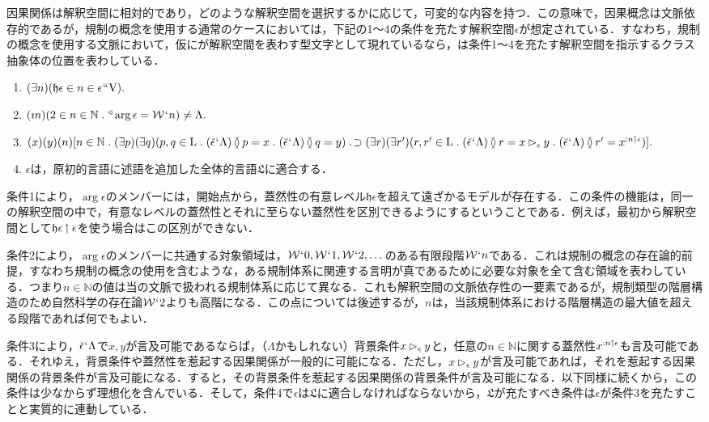 因果関係は解釈空間に相対的であり，どのような解釈空間を選択するかに応じて，可変的な内容を持つ．この意味で，因果概念は文脈依存的であるが，規制の概念を使用する通常のケースにおいては，下記の1〜4の条件を充たす解釈空間$ \epsilon $が想定されている．すなわち，規制の概念を使用する文脈において，仮に\kagi{$ \beta $}が解釈空間を表わす型文字として現れているなら，\kagi{$ \beta $}は条件1〜4を充たす解釈空間を指示するクラス抽象体の位置を表わしている．
\begin{enumerate}
    \item $ (\exists n)(\mathfrak{h}\epsilon\in n \in\epsilon{\mspace{1mu}{``}\mspace{1mu}}\mathrm{V}). $
    \item $ (\imath n)(2\in n\in\mathbb{N}\con{1}\trgl{\arg{\epsilon}}=\mathcal{W}\fap n)\neq\Lambda. $
    \item $ (x)(y)(n)[n\in\mathbb{N}\con{1}(\exists p)(\exists q)(p,q\in\mathrm{L}\con{1}
        (\breve{\epsilon}\fap\Lambda)\exten p = x\con{1}(\breve{\epsilon}\fap\Lambda)\exten q = y
    )\case{1}{1}{0}
    \\\hfill
    (\exists r)(\exists r')(r,r'\in\mathrm{L}\con{1}(\breve{\epsilon}\fap\Lambda)\exten r = x\bkg{\epsilon}y
    \con{1}(\breve{\epsilon}\fap\Lambda)\exten r' = \prob{x}{n\uphl\epsilon}
    )
    ]. $
    \item $\epsilon$は，原初的言語に述語を追加した全体的言語$\mathfrak{L}$に適合する．
\end{enumerate}

条件1により，$ \arg\epsilon $のメンバーには，開始点から，蓋然性の有意レベル$\mathfrak{h}\epsilon$を超えて遠ざかるモデルが存在する．この条件の機能は，同一の解釈空間の中で，有意なレベルの蓋然性とそれに至らない蓋然性を区別できるようにするということである．例えば，最初から解釈空間として$ \mathfrak{h}\epsilon\mathbin{\upharpoonleft}\epsilon $を使う場合はこの区別ができない．

条件2により，$ \arg\epsilon $のメンバーに共通する対象領域は，$ \mathcal{W}{\mspace{1mu}{`}\mspace{1mu}} 0,\mathcal{W}{\mspace{1mu}{`}\mspace{1mu}} 1,\mathcal{W}{\mspace{1mu}{`}\mspace{1mu}} 2,\dots $のある有限段階$\mathcal{W}{\mspace{1mu}{`}\mspace{1mu}} n$である．これは規制の概念の存在論的前提，すなわち規制の概念の使用を含むような，ある規制体系に関連する言明が真であるために必要な対象を全て含む領域を表わしている．つまり$n\in\mathbb{N}$の値は当の文脈で扱われる規制体系に応じて異なる．これも解釈空間の文脈依存性の一要素であるが，規制類型の階層構造のため自然科学の存在論$\mathcal{W}{\mspace{1mu}{`}\mspace{1mu}} 2$よりも高階になる．この点については後述するが，$n$は，当該規制体系における階層構造の最大値を超える段階であれば何でもよい．

条件3により，$\breve{\epsilon}{\mspace{1mu}{`}\mspace{1mu}} \Lambda$で$x,y$が言及可能であるならば，（$\Lambda$かもしれない）背景条件$x\mathbin{\vartriangleright_{\epsilon}}y$と，任意の$n\in\mathbb{N}$に関する蓋然性$ x^{:n\mathbin{\upharpoonleft}\epsilon} $も言及可能である．それゆえ，背景条件や蓋然性を惹起する因果関係が一般的に可能になる．ただし，$x\mathbin{\vartriangleright_{\epsilon}}y$が言及可能であれば，それを惹起する因果関係の背景条件が言及可能になる．すると，その背景条件を惹起する因果関係の背景条件が言及可能になる．以下同様に続くから，この条件は少なからず理想化を含んでいる．そして，条件4で$\epsilon$は$\mathfrak{L}$に適合しなければならないから，$\mathfrak{L}$が充たすべき条件は$\epsilon$が条件3を充たすことと実質的に連動している．

